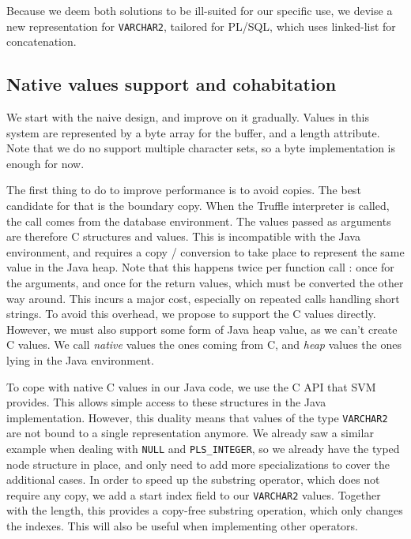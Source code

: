 \documentclass[twoside,11pt,a4paper]{article}
\newcommand{\java}[1]{\textsf{#1}}
\newcommand{\pls}[1]{\small\texttt{#1}\normalsize}
\newcommand{\plstype}[1]{\pls{#1}}
\newcommand{\varchar}{\plstype{VARCHAR2}}
\newcommand{\plsi}{\plstype{PLS\_INTEGER}}
\newcommand{\plsnull}{\pls{NULL}}
\begin{document}
Because we deem both solutions to be ill-suited for our specific use, we devise a new representation for \varchar{}, tailored for PL/SQL, which uses linked-list for concatenation.

\subsection{Native values support and cohabitation}


We start with the naive design, and improve on it gradually. Values in this system are represented by a \java{byte} array for the buffer, and a length attribute. Note that we do no support multiple character sets, so a \java{byte} implementation is enough for now.

The first thing to do to improve performance is to avoid copies. The best candidate for that is the boundary copy. When the Truffle interpreter is called, the call comes from the database environment. The values passed as arguments are therefore C structures and values. This is incompatible with the Java environment, and requires a copy / conversion to take place to represent the same value in the Java heap. Note that this happens twice per function call : once for the arguments, and once for the return values, which must be converted the other way around. This incurs a major cost, especially on repeated calls handling short strings. To avoid this overhead, we propose to support the C values directly. However, we must also support some form of Java heap value, as we can't create C values. We call \textit{native} values the ones coming from C, and \textit{heap} values the ones lying in the Java environment.

To cope with native C values in our Java code, we use the C API that SVM provides. This allows simple access to these structures in the Java implementation. However, this duality means that values of the type \varchar{} are not bound to a single representation anymore. We already saw a similar example when dealing with \plsnull{} and \plsi{}, so we already have the typed node structure in place, and only need to add more specializations to cover the additional cases. In order to speed up the substring operator, which does not require any copy, we add a start index field to our \varchar{} values. Together with the length, this provides a copy-free substring operation, which only changes the indexes. This will also be useful when implementing other operators.
\end{document}

